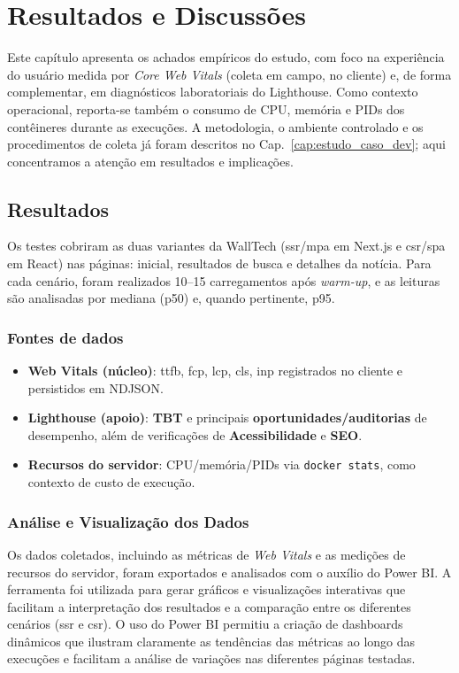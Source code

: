 \chapter{Resultados e Discussões}
\label{cap:resultados}

Este capítulo apresenta os achados empíricos do estudo, com foco na experiência do usuário medida por \textit{Core Web Vitals} (coleta em campo, no cliente) e, de forma complementar, em diagnósticos laboratoriais do Lighthouse. Como contexto operacional, reporta-se também o consumo de CPU, memória e PIDs dos contêineres durante as execuções. A metodologia, o ambiente controlado e os procedimentos de coleta já foram descritos no Cap.~\ref{cap:estudo_caso_dev}; aqui concentramos a atenção em resultados e implicações.

\section{Resultados}
Os testes cobriram as duas variantes da WallTech (\acrshort{ssr}/\acrshort{mpa} em Next.js e \acrshort{csr}/\acrshort{spa} em React) nas páginas: inicial, resultados de busca e detalhes da notícia. Para cada cenário, foram realizados 10--15 carregamentos após \textit{warm-up}, e as leituras são analisadas por mediana (p50) e, quando pertinente, p95.

\subsection{Fontes de dados}
\begin{itemize}
    \item \textbf{Web Vitals (núcleo)}: \acrshort{ttfb}, \acrshort{fcp}, \acrshort{lcp}, \acrshort{cls}, \acrshort{inp} registrados no cliente e persistidos em NDJSON.
    \item \textbf{Lighthouse (apoio)}: \textbf{TBT} e principais \textbf{oportunidades/auditorias} de desempenho, além de verificações de \textbf{Acessibilidade} e \textbf{SEO}.
    \item \textbf{Recursos do servidor}: CPU/memória/PIDs via \texttt{docker stats}, como contexto de custo de execução.
\end{itemize}

\subsection{Análise e Visualização dos Dados}
Os dados coletados, incluindo as métricas de \textit{Web Vitals} e as medições de recursos do servidor, foram exportados e analisados com o auxílio do Power BI. A ferramenta foi utilizada para gerar gráficos e visualizações interativas que facilitam a interpretação dos resultados e a comparação entre os diferentes cenários (\acrshort{ssr} e \acrshort{csr}). O uso do Power BI permitiu a criação de dashboards dinâmicos que ilustram claramente as tendências das métricas ao longo das execuções e facilitam a análise de variações nas diferentes páginas testadas.

